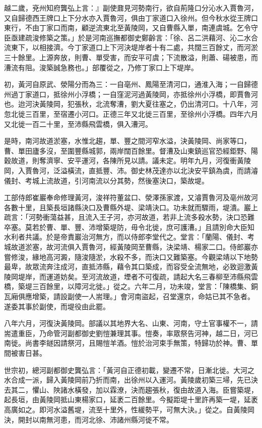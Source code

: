 越二歲，兗州知府龔弘上言：』副使鼐見河勢南行，欲自荊隆口分沁水入賈魯河，又自歸德西王牌口上下分水亦入賈魯河，俱由丁家道口入徐州。但今秋水從王牌口東行，不由丁家口而南，顧逆流東北至黃陵岡，又自曹縣入單，南連虞城。乞令守臣亟建疏浚修築之策。」於是河南巡撫都御史鄭齡言：「徐、呂二洪藉河、沁二水合流東下，以相接濟。今丁家道口上下河決堤岸者十有二處，共闊三百餘丈，而河淤三十餘里。上源奔放，則曹、單受害，而安平可虞；下流散溢，則蕭、碭被患，而漕流有阻。浚築誠急務也。」部覆從之，乃修丁家口上下堤岸。

初，黃河自原武、滎陽分而為三：一自亳州、鳳陽至清河口，通淮入海；一自歸德州過丁家道口，抵徐州小浮橋；一自窪泥河過黃陵岡，亦抵徐州小浮橋，即賈魯河也。迨河決黃陵岡，犯張秋，北流奪漕，劉大夏往塞之，仍出清河口。十八年，河忽北徙三百里，至宿遷小河口。正德三年又北徙三百里，至徐州小浮橋。四年六月又北徙一百二十里，至沛縣飛雲橋，俱入漕河。

是時，南河故道淤塞，水惟北趨，單、豐之間河窄水溢，決黃陵岡、尚家等口，曹、單田廬多沒，至圍豐縣城郭，兩岸闊百餘里。督漕及山東鎮巡官恐經鉅野、陽穀故道，則奪濟寧、安平運河，各陳所見以請。議未定。明年九月，河復衝黃陵岡，入賈魯河，泛溢橫流，直抵豐、沛。御史林茂達亦以北決安平鎮為虞，而請濬儀封、考城上流故道，引河南流以分其勢，然後塞決口，築故堤。

工部侍郎崔巖奉命修理黃河，浚祥符董盆口、滎澤孫家渡，又濬賈魯河及亳州故河各數十里，且築長垣諸縣決口及曹縣外堤、梁靖決口。功未就而驟雨，堤潰。巖上疏言：「河勢衝蕩益甚，且流入王子河，亦河故道，若非上流多殺水勢，決口恐難卒塞。莫若於曹、單、豐、沛增築堤防，毋令北徙，庶可護漕。」且請別命大臣知水利者共議。於是帝責巖治河無方，而以侍郎李堂代之。堂言：「蘭陽、儀封、考城故道淤塞，故河流俱入賈魯河，經黃陵岡至曹縣，決梁靖、楊家二口。侍郎巖亦嘗修浚，緣地高河澱，隨浚隨淤，水殺不多，而決口又難築塞。今觀梁靖以下地勢最卑，故眾流奔注成河，直抵沛縣，藉令其口築成，而容受全流無地，必致迴激黃陵岡堤岸，而運道妨矣。至河流故道，堙者不可復疏，請起大名三春柳至沛縣飛雲橋，築堤三百餘里，以障河北徙。」從之。六年二月，功未竣，堂言：「陳橋集、銅瓦廂俱應增築，請設副使一人耑理。」會河南盜起，召堂還京，命姑已其不急者。遂委其事於副使，而堤役由此罷。

八年六月，河復決黃陵岡。部議以其地界大名、山東、河南，守土官事權不一，請耑遣重臣，乃命管河副都御史劉愷兼理其事。愷奏，率眾祭告河神，越二日，河已南徙。尚書李鐩因請祭河，且賜愷羊酒。愷於治河束手無策，特歸功於神。曹、單間被害日甚。

世宗初，總河副都御史龔弘言：「黃河自正德初載，變遷不常，日漸北徙。大河之水合成一派，歸入黃陵岡前乃折而南，出徐州以入運河。黃陵歲初築三埽，先已決去其二，懼山、陜諸水橫發，加以霖潦，決而趨張秋，復由故道入海。臣嘗築堤，起長垣，由黃陵岡抵山東楊家口，延袤二百餘里。今擬距堤十里許再築一堤，延袤高廣如之。即河水溢舊堤，流至十里外，性緩勢平，可無大決。」從之。自黃陵岡決，開封以南無河患，而河北徐、沛諸州縣河徙不常。

